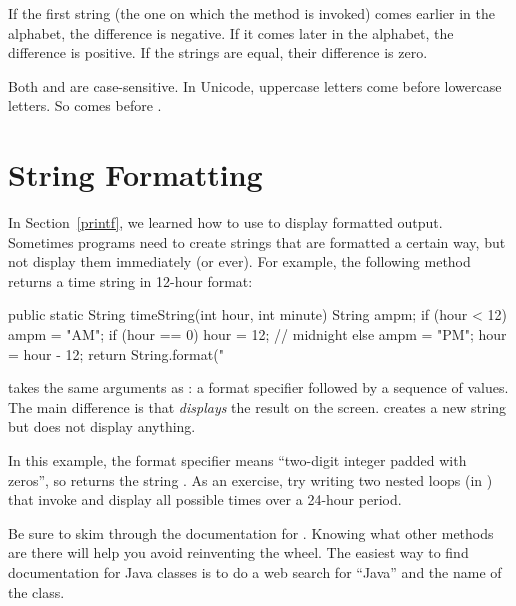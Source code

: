If the first string (the one on which the method is invoked) comes earlier in the alphabet, the difference is negative.
If it comes later in the alphabet, the difference is positive.
If the strings are equal, their difference is zero.


Both  and  are case-sensitive.
In Unicode, uppercase letters come before lowercase letters.
So  comes before .


\section{String Formatting}


In Section~\ref{printf}, we learned how to use  to display formatted output.
Sometimes programs need to create strings that are formatted a certain way, but not display them immediately (or ever).
For example, the following method returns a time string in 12-hour format:

\begin{code}
public static String timeString(int hour, int minute) {
    String ampm;
    if (hour < 12) {
        ampm = "AM";
        if (hour == 0) {
            hour = 12;  // midnight
        }
    } else {
        ampm = "PM";
        hour = hour - 12;
    }
    return String.format("%
}
\end{code}


 takes the same arguments as : a format specifier followed by a sequence of values.
The main difference is that  {\em displays} the result on the screen.
 creates a new string but does not display anything.

In this example, the format specifier  means ``two-digit integer padded with zeros'', so  returns the string .
As an exercise, try writing two nested  loops (in ) that invoke  and display all possible times over a 24-hour period.

Be sure to skim through the documentation for .
Knowing what other methods are there will help you avoid reinventing the wheel.
The easiest way to find documentation for Java classes is to do a web search for ``Java'' and the name of the class.


